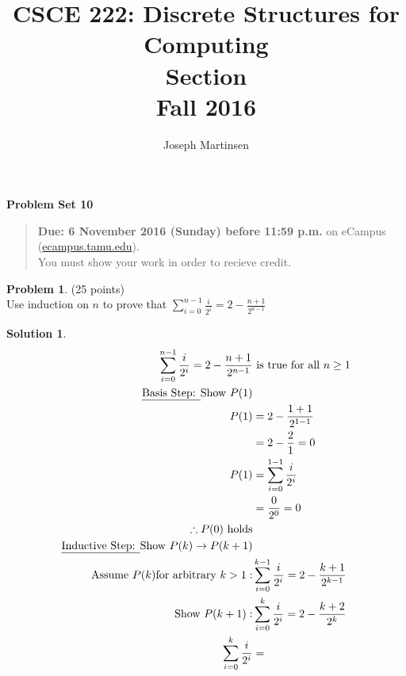 \documentclass{article}
\title{CSCE 222: Discrete Structures for Computing\\Section \mysectionnumber\\Fall 2016}
\author{Joseph Martinsen}
\theoremstyle{definition}
\newtheorem{problem}{Problem}
\newtheorem*{solution}{Solution}
\newcommand{\problemset}[1]{\begin{center}\textbf{Problem Set #1}\end{center}}
\newcommand{\duedate}[1]{\begin{quote}\textbf{Due: #1} on eCampus (\url{ecampus.tamu.edu}). \\You must show your work in order to recieve credit.\end{quote}}
\begin{document}
\maketitle

\problemset{10}

\duedate{6 November 2016 (Sunday) before 11:59 p.m.}

\bigskip

\begin{problem} (25 points)\\
Use  induction on $n$ to prove that $\displaystyle \sum_{i=0}^{n-1} \frac{i}{2^i} = 2-\frac{n+1}{2^{n-1}}$
\end{problem}

\begin{solution}\ \\

  \begin{align*}
    \displaystyle \sum_{i=0}^{n-1} \frac{i}{2^i} = 2-\frac{n+1}{2^{n-1}}  &\text{ is true for all } n \geq 1 \\
    \text{\underline{Basis Step: }Show } P(1)&\\
    P(1) &= 2-\frac{1+1}{2^{1-1}} \\
    &= 2-\frac{2}{1} = 0\\
    P(1) &= \displaystyle \sum_{i=0}^{1-1} \frac{i}{2^i} \\
    &= \frac{0}{2^0} = 0\\
    \therefore P(0) \text{ holds} \\
    \text{\underline{Inductive Step: }Show }P(k) \rightarrow P(k+1)\\
    \text{Assume } P(k) \text{for arbitrary } k > 1: &\displaystyle \sum_{i=0}^{k-1} \frac{i}{2^i} = 2-\frac{k+1}{2^{k-1}} \\
    \text{Show }P(k+1):& \displaystyle \sum_{i=0}^{k} \frac{i}{2^i} = 2-\frac{k+2}{2^{k}} \\
    \displaystyle \sum_{i=0}^{k} \frac{i}{2^i} &=
  \end{align*}

\end{solution}

\newpage
\end{document}
